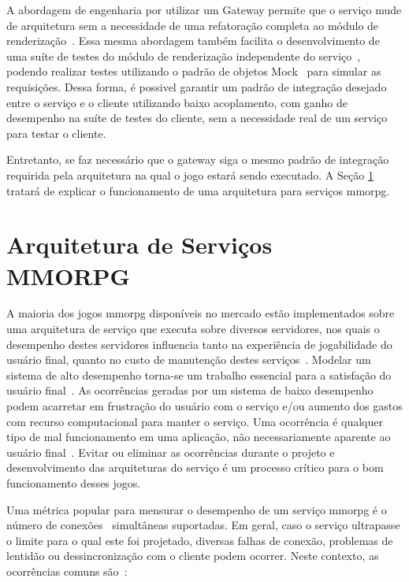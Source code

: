 A abordagem de engenharia por utilizar um Gateway permite que o serviço mude de arquitetura sem a necessidade de uma refatoração completa ao módulo de renderização~\cite{albion_online_unite, stephenclarkewillson2017}.
%
Essa mesma abordagem também facilita o desenvolvimento de uma suíte de testes do módulo de renderização independente do serviço~\cite{Freeman2009Oct}, podendo realizar testes utilizando o padrão de objetos Mock~\cite{Beck2004Nov} para simular as requisições.
%
Dessa forma, é possivel garantir um padrão de integração desejado entre o serviço e o cliente utilizando baixo acoplamento, com ganho de desempenho na suíte de testes do cliente, sem a necessidade real de um serviço para testar o cliente.



Entretanto, se faz necessário que o gateway siga o mesmo padrão de integração requirida pela arquitetura na qual o jogo estará sendo executado.
%
A Seção \ref{sec:arquiteturas} tratará de explicar o funcionamento de uma arquitetura para serviços \ac{mmorpg}.



\section{Arquitetura de Serviços MMORPG}
\label{sec:arquiteturas}



A maioria dos jogos \ac{mmorpg} disponíveis no mercado estão implementados sobre uma arquitetura de serviço que executa sobre diversos servidores\cite{stephenclarkewillson2017}, nos quais o desempenho destes servidores influencia tanto na experiência de jogabilidade do usuário final, quanto no custo de manutenção destes serviços~\cite{1417630}.
%
Modelar um sistema de alto desempenho torna-se um trabalho essencial para a satisfação do usuário final~\cite{1417630}.
%
As ocorrências geradas por um sistema de baixo desempenho podem acarretar em frustração do usuário com o serviço e/ou aumento dos gastos com recurso computacional para manter o serviço.
%
Uma ocorrência é qualquer tipo de mal funcionamento em uma aplicação, não necessariamente aparente ao usuário final~\cite{1417630}.
%
Evitar ou eliminar as ocorrências durante o projeto e desenvolvimento das arquiteturas do serviço é um processo crítico para o bom funcionamento desses jogos.



Uma métrica popular para mensurar o desempenho de um serviço \ac{mmorpg} é o número de conexões~\cite{1417630} simultâneas suportadas.
%
Em geral, caso o serviço ultrapasse o limite para o qual este foi projetado, diversas falhas de conexão, problemas de lentidão ou dessincronização com o cliente podem ocorrer.
%
Neste contexto, as ocorrências comuns são~\cite{1417630}:



